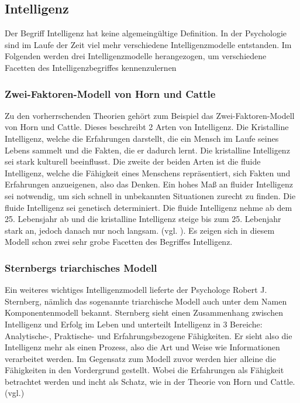 \documentclass[a4paper, 11pt]{scrartcl}
\begin{document}
\subsection{Intelligenz}
Der Begriff Intelligenz hat keine algemeingültige Definition. In der Psychologie sind im Laufe der Zeit viel mehr verschiedene Intelligenzmodelle entstanden. Im Folgenden werden drei Intelligenzmodelle herangezogen, um verschiedene Facetten des Intelligenzbegriffes kennenzulernen

\subsubsection{Zwei-Faktoren-Modell von Horn und Cattle}
Zu den vorherrschenden Theorien gehört zum Beispiel das Zwei-Faktoren-Modell von Horn und Cattle. Dieses beschreibt 2 Arten von Intelligenz. Die Kristalline Intelligenz, welche die Erfahrungen darstellt, die ein Mensch im Laufe seines Lebens sammelt und die Fakten, die er dadurch lernt. Die kristalline Intelligenz sei stark kulturell beeinflusst. Die zweite der beiden Arten ist die fluide Intelligenz, welche die Fähigkeit eines Menschens repräsentiert, sich Fakten und Erfahrungen anzueigenen, also das Denken. Ein hohes Maß an fluider Intelligenz sei notwendig, um sich schnell in unbekannten Situationen zurecht zu finden. Die fluide Intelligenz sei genetisch determiniert. Die fluide Intelligenz nehme ab dem 25. Lebensjahr ab und die kristalline Intelligenz steige bis zum 25. Lebenjahr stark an, jedoch danach nur noch langsam. (vgl. \cite{Dorsch2019}). Es zeigen sich in diesem Modell schon zwei sehr grobe Facetten des Begriffes Intelligenz.

\subsubsection{Sternbergs triarchisches Modell}
Ein weiteres wichtiges Intelligenzmodell lieferte der Psychologe Robert J. Sternberg, nämlich das sogenannte triarchische Modell auch unter dem Namen Komponentenmodell bekannt. Sternberg sieht einen Zusammenhang zwischen Intelligenz und Erfolg im Leben und unterteilt Intelligenz in 3 Bereiche: Analytische-, Praktische- und Erfahrungsbezogene Fähigkeiten. Er sieht also die Intelligenz mehr als einen Prozess, also die Art und Weise wie Informationen verarbeitet werden. Im Gegensatz zum Modell zuvor werden hier alleine die Fähigkeiten in den Vordergrund gestellt. Wobei die Erfahrungen als Fähigkeit betrachtet werden und incht als Schatz, wie in der Theorie von Horn und Cattle. (vgl.\cite{Stern1984})
\end{document}
